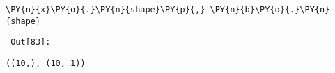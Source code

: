 {\par%
\vspace{-1\baselineskip}%
}%
\begin{notebookcell}[83]%
\begin{addmargin}[\cellleftmargin]{0em}%
{\smaller%
\par%
%
\vspace{-1\smallerfontscale}%
\begin{Verbatim}[commandchars=\\\{\}]
\PY{n}{x}\PY{o}{.}\PY{n}{shape}\PY{p}{,} \PY{n}{b}\PY{o}{.}\PY{n}{shape}
\end{Verbatim}
%
\par%
\vspace{-1\smallerfontscale}}%
\end{addmargin}
\end{notebookcell}

\par\vspace{1\smallerfontscale}%
    
        {\par%
        \vspace{-1\smallerfontscale}%
        \noindent%
        \begin{minipage}{\cellleftmargin}%
    \hfill%
    {\smaller%
    \tt%
    \color{nbframe-out-prompt}%
    Out[83]:}%
    \hspace{\inputpadding}%
    \hspace{0em}%
    \hspace{3pt}%
    \end{minipage}%
        }%
    \begin{addmargin}[\cellleftmargin]{0em}%
    {\smaller%
    \vspace{-1\smallerfontscale}%
    
    
    
    \begin{verbatim}
((10,), (10, 1))
    \end{verbatim}

    
}%
    \end{addmargin}%

